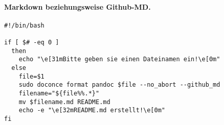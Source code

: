 \documentclass[%
oneside,                 %
final,                   %
chapterprefix=true,      %
open=right,              %
10pt]{book}
\newcommand{\clearemptydoublepage}{\clearpage{\pagestyle{empty}\cleardoublepage}}
\begin{document}
\paragraph{Markdown beziehungsweise Github-MD.}

\begin{verbatim}
#!/bin/bash

if [ $# -eq 0 ]
  then
    echo "\e[31mBitte geben sie einen Dateinamen ein!\e[0m"
  else
    file=$1
    sudo doconce format pandoc $file --no_abort --github_md
    filename="${file%%.*}"
    mv $filename.md README.md
    echo -e "\e[32mREADME.md erstellt!\e[0m"
fi
\end{verbatim}



\clearemptydoublepage
{}
\thispagestyle{empty}
\printindex
\end{document}
